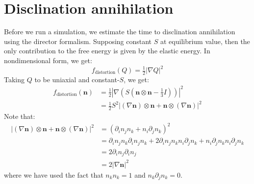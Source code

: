 \documentclass[reqno]{article}
\begin{document}
\section{Disclination annihilation}
Before we run a simulation, we estimate the time to disclination annihilation using the director formalism.
Supposing constant $S$ at equilibrium value, then the only contribution to the free energy is given by the elastic energy.
In nondimensional form, we get:
\begin{equation}
    f_\text{distortion}(Q)
    =
    \tfrac12 \left| \nabla Q \right|^2
\end{equation}
Taking $Q$ to be uniaxial and constant-$S$, we get:
\begin{equation}
    \begin{split}
        f_\text{distortion}(\mathbf{n})
        &=
        \tfrac12 \left| \nabla \left( S \left(\mathbf{n} \otimes \mathbf{n} - \tfrac13 I \right) \right) \right|^2 \\
        &=
        \tfrac12 S^2 \left| \left(\nabla \mathbf{n} \right) \otimes \mathbf{n} 
            + \mathbf{n} \otimes \left(\nabla \mathbf{n} \right) \right|^2
    \end{split}
\end{equation}
Note that:
\begin{equation}
    \begin{split}
        \left| \left(\nabla \mathbf{n} \right)\otimes \mathbf{n}
            + \mathbf{n} \otimes \left(\nabla \mathbf{n}\right) \right|^2
        &=
        \left( \partial_i n_j n_k + n_i \partial_j n_k \right)^2 \\
        &=
        \partial_i n_j n_k \partial_i n_j n_k 
        + 2 \partial_i n_j n_k n_i \partial_j n_k
        + n_i \partial_j n_k n_i \partial_j n_k \\
        &=
        2 \partial_i n_j \partial_i n_j \\
        &=
        2 \left| \nabla \mathbf{n} \right|^2
    \end{split}
\end{equation}
where we have used the fact that $n_k n_k = 1$ and $n_k \partial_j n_k = 0$.
\end{document}

